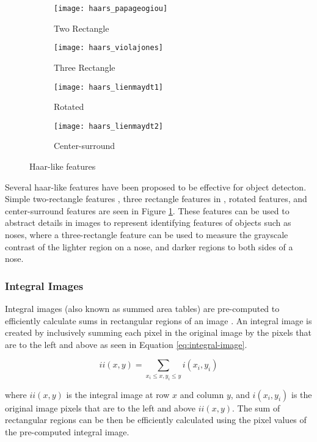 \begin{figure}[htb]
  \begin{subfigure}[t]{2in}
    \centering
    \texttt{[image: haars\_papageogiou]}
    \caption{Two Rectangle}
  \end{subfigure}
  \hfill
  \begin{subfigure}[t]{2in}
    \centering
    \texttt{[image: haars\_violajones]}
    \caption{Three Rectangle}
  \end{subfigure}
  \hfill
  \begin{subfigure}[t]{2in}
    \centering
    \texttt{[image: haars\_lienmaydt1]}
    \caption{Rotated}
  \end{subfigure}
  \hfill
  \begin{subfigure}[t]{2in}
    \centering
    \texttt{[image: haars\_lienmaydt2]}
    \caption{Center-surround}
  \end{subfigure}
  \caption{Haar-like features}
  \label{fig:haars}
\end{figure}

Several haar-like features have been proposed to be effective for object detecton. Simple two-rectangle features \cite{Papageorgiou:1998}, three rectangle features in \cite{Viola:2001}, rotated features, and center-surround features \cite{Lienhart:2002} are seen in Figure \ref{fig:haars}. These features can be used to abstract details in images to represent identifying features of objects such as noses, where a three-rectangle feature can be used to measure the grayscale contrast of the lighter region on a nose, and darker regions to both sides of a nose.

\subsubsection{Integral Images} \label{haar-like-features}

Integral images (also known as summed area tables) are pre-computed to efficiently calculate sums in rectangular regions of an image \cite{Crow:1984}. An integral image is created by inclusively summing each pixel in the original image by the pixels that are to the left and above as seen in Equation \ref{eq:integral-image}.

\begin{equation} \label{eq:integral-image}
  ii(x, y) = \sum_{x_i \leq x, y_i \leq y}{i(x_i, y_i)}
\end{equation}

where $ii(x,y)$ is the integral image at row $x$ and column $y$, and $i(x_i, y_i)$ is the original image pixels that are to the left and above $ii(x,y)$. The sum of rectangular regions can be then be efficiently calculated using the pixel values of the pre-computed integral image.

